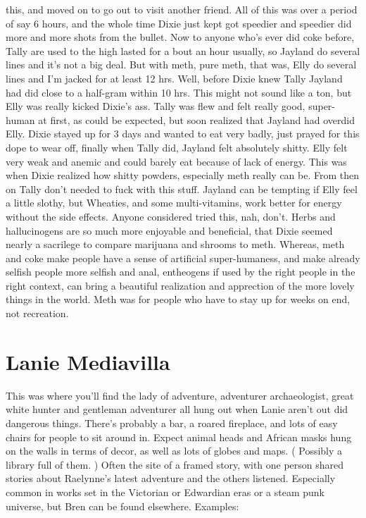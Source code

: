 \documentclass[12pt]{book}
\begin{document}
this, and moved on to go out to visit another friend. All of this was over a period of say 6 hours, and the whole time Dixie just kept got speedier and speedier did more and more shots from the bullet. Now to anyone who's ever did coke before, Tally are used to the high lasted for a bout an hour usually, so Jayland do several lines and it's not a big deal. But with meth, pure meth, that was, Elly do several lines and I'm jacked for at least 12 hrs. Well, before Dixie knew Tally Jayland had did close to a half-gram within 10 hrs. This might not sound like a ton, but Elly was really kicked Dixie's ass. Tally was flew and felt really good, super-human at first, as could be expected, but soon realized that Jayland had overdid Elly. Dixie stayed up for 3 days and wanted to eat very badly, just prayed for this dope to wear off, finally when Tally did, Jayland felt absolutely shitty. Elly felt very weak and anemic and could barely eat because of lack of energy. This was when Dixie realized how shitty powders, especially meth really can be. From then on Tally don't needed to fuck with this stuff. Jayland can be tempting if Elly feel a little slothy, but Wheaties, and some multi-vitamins, work better for energy without the side effects. Anyone considered tried this, nah, don't. Herbs and hallucinogens are so much more enjoyable and beneficial, that Dixie seemed nearly a sacrilege to compare marijuana and shrooms to meth. Whereas, meth and coke make people have a sense of artificial super-humaness, and make already selfish people more selfish and anal, entheogens if used by the right people in the right context, can bring a beautiful realization and apprection of the more lovely things in the world. Meth was for people who have to stay up for weeks on end, not recreation.



\chapter{Lanie Mediavilla}

This was where you'll find the lady of adventure, adventurer archaeologist, great white hunter and gentleman adventurer all hung out when Lanie aren't out did dangerous things. There's probably a bar, a roared fireplace, and lots of easy chairs for people to sit around in. Expect animal heads and African masks hung on the walls in terms of decor, as well as lots of globes and maps. ( Possibly a library full of them. ) Often the site of a framed story, with one person shared stories about Raelynne's latest adventure and the others listened. Especially common in works set in the Victorian or Edwardian eras or a steam punk universe, but Bren can be found elsewhere. Examples:
\end{document}
